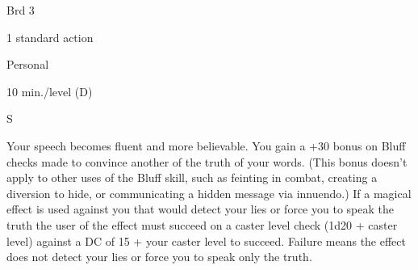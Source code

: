
\begin{description*}
\item[Level:] Brd 3
\item[Casting Time:] 1 standard action
\item[Range:] Personal
\item[Duration:] 10 min./level (D)
\item[Components:] S
\end{description*}

Your speech becomes fluent and more believable. You gain a +30 bonus on Bluff checks
made to convince another of the truth of your words. (This bonus doesn't apply
to other uses of the Bluff skill, such as feinting in combat, creating a diversion
to hide, or communicating a hidden message via innuendo.)
If a magical effect is used against you that would detect your lies or force you
to speak the truth the user of the effect must succeed on a caster level check
(1d20 + caster level) against a DC of 15 + your caster level to succeed. Failure
means the effect does not detect your lies or force you to speak only the truth.